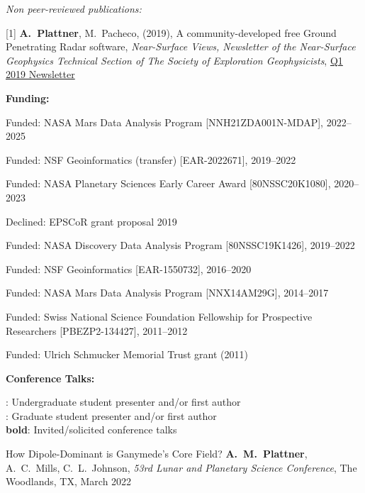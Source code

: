 \documentclass[10pt]{article}
\begin{document}
\spc
\emph{Non peer-reviewed publications:}

\spcp
\hspace{-0.5cm}[1] \textbf{A.~Plattner}, M.~Pacheco, (2019), A
community-developed free Ground Penetrating Radar software,
\emph{Near-Surface Views, Newsletter of the Near-Surface Geophysics
  Technical Section of The Society of Exploration Geophysicists},
\href{https://seg.org/Portals/0/SEG/News%20and%20Resources/Near%20Surface/Near%20Surface%20Newsletter/2011-present/2019_Q1.pdf}{Q1
  2019 Newsletter}


\spc
\textbf{\tsize Funding:}

\spcp
Funded: NASA Mars Data Analysis Program [NNH21ZDA001N-MDAP], 2022--2025

\spcp
Funded: NSF Geoinformatics (transfer) [EAR-2022671], 2019--2022 

\spcp
Funded: NASA Planetary Sciences Early Career Award [80NSSC20K1080], 2020--2023

\spcp Declined: EPSCoR grant proposal 2019

\spcp
Funded: NASA Discovery Data Analysis Program [80NSSC19K1426], 2019--2022

\spcp
  Funded: NSF Geoinformatics
  [EAR-1550732],
  2016--2020

 \spcp 
Funded: NASA Mars Data Analysis Program [NNX14AM29G], 2014--2017

\spcp Funded: Swiss National Science Foundation Fellowship for Prospective Researchers
[PBEZP2-134427], 2011--2012

\spcp
Funded: Ulrich Schmucker Memorial Trust grant (2011)

\spc

\textbf{\tsize Conference Talks:}

\spcp
\ug: Undergraduate student presenter and/or first author\\
\gr: Graduate student presenter and/or first author\\
\textbf{bold}: Invited/solicited conference talks

\spcp
\hspace{-0.4cm} \gr \hspace{-0.03cm} How Dipole-Dominant is Ganymede’s Core Field? \textbf{A.~M.~Plattner}, A.~C.~Mills, C.~L.~Johnson, \emph{53rd Lunar and Planetary Science Conference},
The Woodlands, TX, March 2022
\end{document}
